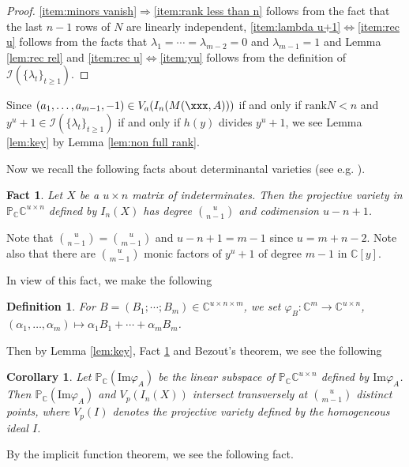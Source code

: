 \documentclass[a4paper,12pt]{article}
\newcommand{\CCC}{\mathbb{C}}
\newcommand{\PPP}{\mathbb{P}}
\newcommand{\msIII}{\mathscr{I}}
\newcommand{\height}{\mathrm{ht}}
\newcommand{\rank}{\mathrm{rank}}
\newcommand{\image}{{\mathrm{Im}}}
\newtheorem{fact}[thm]{Fact}
\newtheorem{cor}[thm]{Corollary}
\newtheorem{definition}[thm]{Definition}
\begin{document}
\begin{proof}
\ref{item:minors vanish}$\Longrightarrow$\ref{item:rank less than n}
follows from the fact that
the last $n-1$ rows of $N$ are linearly independent,
\ref{item:lambda u+1}$\iff$\ref{item:rec u} follows from the facts that
$\lambda_1=\cdots=\lambda_{m-2}=0$ and $\lambda_{m-1}=1$ and
Lemma \ref{lem:rec rel}
and
\ref{item:rec u}$\iff$\ref{item:yu} follows from the definition of
$\msIII(\{\lambda_t\}_{t\geq 1})$.
\end{proof}


Since $(a_1,\ldots, a_{m-1},-1)\in V_a(I_n(M(\xxx,A)))$
if and only if $\rank N<n$ and $y^u+1\in\msIII(\{\lambda_t\}_{t\geq 1})$
if and only if $h(y)$ divides $y^u+1$, we see Lemma \ref{lem:key} by
Lemma \ref{lem:non full rank}.




Now we recall the following facts about determinantal varieties
(see e.g. \cite[p.151 and p.243]{har92}).

\begin{fact}
\label{fac:deg}
Let $X$ be a $u\times n$ matrix of indeterminates.
Then the projective variety in $\PPP_\CCC\CCC^{u\times n}$
defined by $I_n(X)$ has degree ${u\choose n-1}$ and codimension $u-n+1$.

\end{fact}
%
%
Note that ${u\choose n-1}={u\choose m-1}$ and $u-n+1=m-1$ since $u=m+n-2$.
Note also that there are ${u\choose m-1}$ monic factors of $y^u+1$ of degree $m-1$
in $\CCC[y]$.


In view of this fact, we make the following

\begin{definition}\rm
For $B=(B_1;\cdots; B_m)\in\CCC^{u\times n\times m}$,
we set
$\varphi_B\colon\CCC^m\to\CCC^{u\times n}$,
$(\alpha_1,\ldots, \alpha_m)\mapsto\alpha_1B_1+\cdots+\alpha_mB_m$.
\end{definition}
%
%
Then by Lemma \ref{lem:key}, Fact \ref{fac:deg} and Bezout's theorem,
we see the following

\begin{cor}
Let $\PPP_\CCC(\image\varphi_A)$ be the linear subspace of $\PPP_\CCC\CCC^{u\times n}$
defined by $\image\varphi_A$.
Then $\PPP_\CCC(\image\varphi_A)$ and $V_p(I_n(X))$ intersect transversely
at ${u\choose m-1}$ distinct points,
where $V_p(I)$ denotes the projective variety defined by the homogeneous ideal $I$.
\end{cor}
%
%
By the implicit function theorem, we see the following fact.
\end{document}
